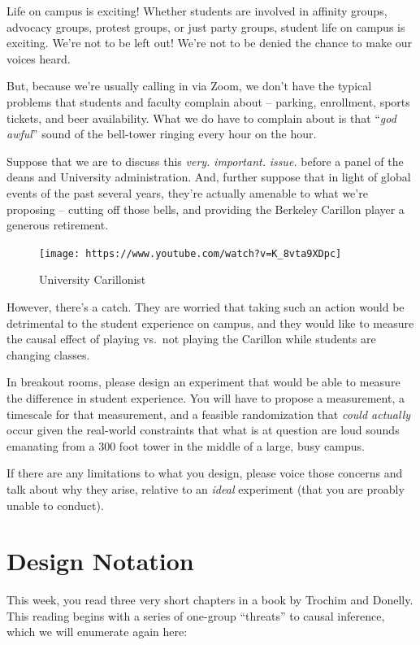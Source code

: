 \documentclass[
]{book}
\begin{document}
Life on campus is exciting! Whether students are involved in affinity
groups, advocacy groups, protest groups, or just party groups, student
life on campus is exciting. We're not to be left out! We're not to be
denied the chance to make our voices heard.

But, because we're usually calling in via Zoom, we don't have the
typical problems that students and faculty complain about -- parking,
enrollment, sports tickets, and beer availability. What we do have to
complain about is that ``\emph{god awful}'' sound of the bell-tower
ringing every hour on the hour.

Suppose that we are to discuss this \emph{very.} \emph{important.}
\emph{issue.} before a panel of the deans and University administration.
And, further suppose that in light of global events of the past several
years, they're actually amenable to what we're proposing -- cutting off
those bells, and providing the Berkeley Carillon player a generous
retirement.

\begin{figure}
\centering
\texttt{[image: https://www.youtube.com/watch?v=K\_8vta9XDpc]}
\caption{University Carillonist}
\end{figure}

However, there's a catch. They are worried that taking such an action
would be detrimental to the student experience on campus, and they would
like to measure the causal effect of playing vs.~not playing the
Carillon while students are changing classes.

In breakout rooms, please design an experiment that would be able to
measure the difference in student experience. You will have to propose a
measurement, a timescale for that measurement, and a feasible
randomization that \emph{could actually} occur given the real-world
constraints that what is at question are loud sounds emanating from a
300 foot tower in the middle of a large, busy campus.

If there are any limitations to what you design, please voice those
concerns and talk about why they arise, relative to an \emph{ideal}
experiment (that you are proably unable to conduct).

\hypertarget{design-notation}{%
\section{Design Notation}\label{design-notation}}

This week, you read three very short chapters in a book by Trochim and
Donelly. This reading begins with a series of one-group ``threats'' to
causal inference, which we will enumerate again here:
\end{document}
